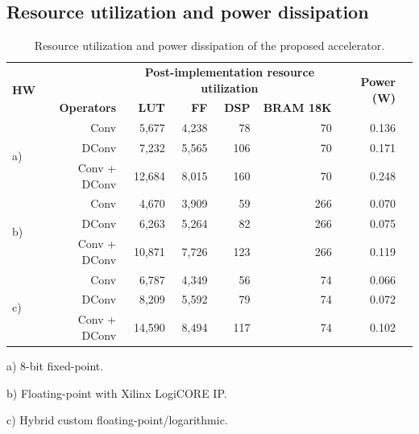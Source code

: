 \subsection{Resource utilization and power dissipation}
\begin{table}[!htp]\centering
	\caption{Resource utilization and power dissipation of the proposed accelerator.}\label{tab: }
	\scriptsize
	\begin{tabular}{lrrrrrrr}\toprule
		\multirow{2}{*}{\textbf{HW}} &\textbf{} &\multicolumn{4}{c}{\textbf{Post-implementation resource utilization}} &\multirow{2}{*}{\textbf{Power (W)}} \\\cmidrule{3-6}
		&\textbf{Operators} &\textbf{LUT} &\textbf{FF} &\textbf{DSP} &\textbf{BRAM 18K} & \\\midrule
		\multirow{3}{*}{a)} &Conv &5,677 &4,238 &78 &70 &0.136 \\
		&DConv &7,232 &5,565 &106 &70 &0.171 \\
		&Conv + DConv &12,684 &8,015 &160 &70 &0.248 \\
		\multirow{3}{*}{b)} &Conv &4,670 &3,909 &59 &266 &0.070 \\
		&DConv &6,263 &5,264 &82 &266 &0.075 \\
		&Conv + DConv &10,871 &7,726 &123 &266 &0.119 \\
		\multirow{3}{*}{c)} &Conv &6,787 &4,349 &56 &74 &0.066 \\
		&DConv &8,209 &5,592 &79 &74 &0.072 \\
		&Conv + DConv &14,590 &8,494 &117 &74 &0.102 \\
		\bottomrule
	\end{tabular}
	\begin{tablenotes}
		\item a) 8-bit fixed-point.
		\item b) Floating-point with Xilinx LogiCORE IP.
		\item c) Hybrid custom floating-point/logarithmic.
	\end{tablenotes}
\end{table}

